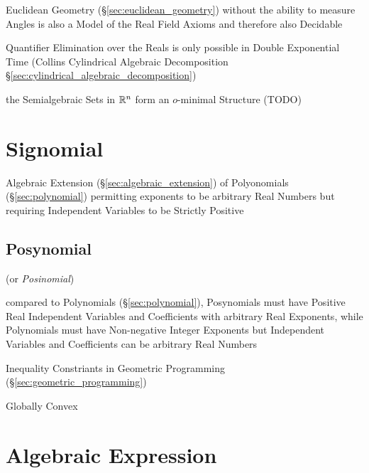 Euclidean Geometry (\S\ref{sec:euclidean_geometry}) without the ability to
measure Angles is also a Model of the Real Field Axioms and therefore also
Decidable

Quantifier Elimination over the Reals is only possible in Double Exponential
Time (Collins Cylindrical Algebraic Decomposition
\S\ref{sec:cylindrical_algebraic_decomposition})

the Semialgebraic Sets in $\mathbb{R}^n$ form an $o$-minimal Structure (TODO)



\section{Signomial}\label{sec:signomial}

Algebraic Extension (\S\ref{sec:algebraic_extension}) of Polyonomials
(\S\ref{sec:polynomial}) permitting exponents to be arbitrary Real Numbers but
requiring Independent Variables to be Strictly Positive



\subsection{Posynomial}\label{sec:posynomial}

(or \emph{Posinomial})

compared to Polynomials (\S\ref{sec:polynomial}), Posynomials must have Positive
Real Independent Variables and Coefficients with arbitrary Real Exponents, while
Polynomials must have Non-negative Integer Exponents but Independent Variables
and Coefficients can be arbitrary Real Numbers

Inequality Constriants in Geometric Programming
(\S\ref{sec:geometric_programming})

Globally Convex



\section{Algebraic Expression}\label{sec:algebraic_expression}

